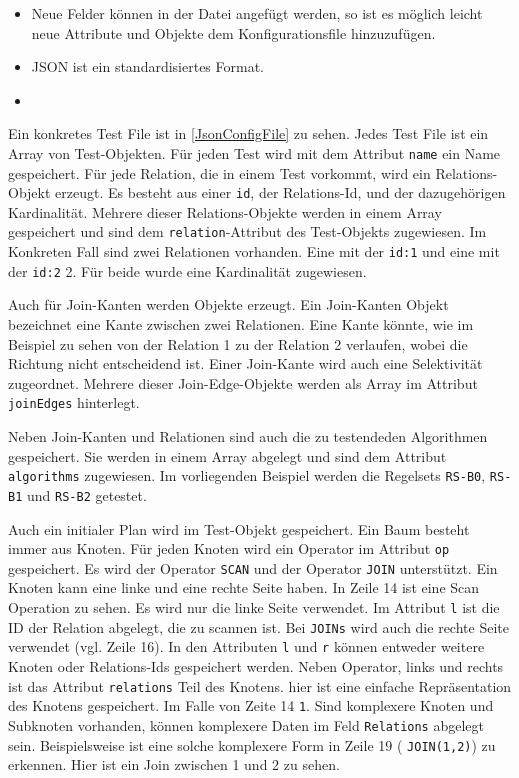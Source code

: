 \begin{itemize}
\item Neue Felder können in der Datei angefügt werden, so ist es möglich leicht neue Attribute und Objekte dem Konfigurationsfile hinzuzufügen.
\item JSON ist ein standardisiertes Format.
\item 
\end{itemize}

Ein konkretes Test File ist in \ref{JsonConfigFile} zu sehen. Jedes Test File ist ein Array von Test-Objekten. Für jeden Test wird mit dem Attribut \texttt{name} ein Name gespeichert. Für jede Relation, die in einem Test vorkommt, wird ein Relations-Objekt erzeugt. Es besteht aus einer \texttt{id}, der Relations-Id, und der dazugehörigen Kardinalität. Mehrere dieser Relations-Objekte werden in einem Array gespeichert und sind dem \texttt{relation}-Attribut des Test-Objekts zugewiesen. Im Konkreten Fall sind zwei Relationen vorhanden. Eine mit der \texttt{id:1} und eine mit der \texttt{id:2} 2. Für beide wurde eine Kardinalität zugewiesen. 

Auch für Join-Kanten werden Objekte erzeugt. Ein Join-Kanten Objekt bezeichnet eine Kante zwischen zwei Relationen. Eine Kante könnte, wie im Beispiel zu sehen von der Relation 1 zu der Relation 2 verlaufen, wobei die Richtung nicht entscheidend ist. Einer Join-Kante wird auch eine Selektivität zugeordnet. Mehrere dieser Join-Edge-Objekte werden als Array im Attribut \texttt{joinEdges} hinterlegt.

Neben Join-Kanten und Relationen sind auch die zu testendeden Algorithmen gespeichert. Sie werden in einem Array abgelegt und sind dem Attribut \texttt{algorithms} zugewiesen. Im vorliegenden Beispiel werden die Regelsets \texttt{RS-B0}, \texttt{RS-B1} und \texttt{RS-B2} getestet.

Auch ein initialer Plan wird im Test-Objekt gespeichert. Ein Baum besteht immer aus Knoten. Für jeden Knoten wird ein Operator im Attribut \texttt{op} gespeichert. Es wird der Operator \texttt{SCAN} und der Operator \texttt{JOIN} unterstützt. Ein Knoten kann eine linke und eine rechte Seite haben. In Zeile 14 ist eine Scan Operation zu sehen. Es wird nur die linke Seite verwendet. Im Attribut \texttt{l} ist die ID der Relation abgelegt, die zu scannen ist. Bei \texttt{JOINs} wird auch die rechte Seite verwendet (vgl. Zeile 16). In den Attributen \texttt{l} und \texttt{r} können entweder weitere Knoten oder Relations-Ids gespeichert werden. Neben Operator, links und rechts ist das Attribut \texttt{relations} Teil des Knotens. hier ist eine einfache Repräsentation des Knotens gespeichert. Im Falle von Zeite 14 \texttt{1}. Sind komplexere Knoten und Subknoten vorhanden, können komplexere Daten im Feld \texttt{Relations} abgelegt sein. Beispielsweise ist eine solche komplexere Form in Zeile 19 ( \texttt{JOIN(1,2)}) zu erkennen. Hier ist ein Join zwischen 1 und 2 zu sehen.

